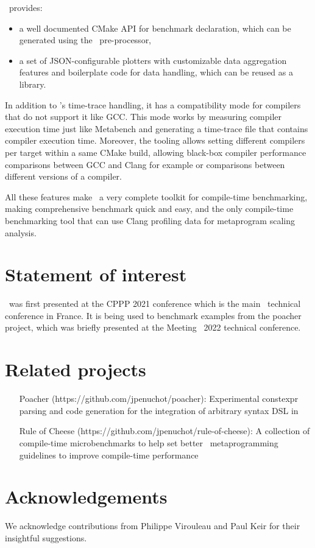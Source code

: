 \documentclass[../../main.tex]{subfiles}
\begin{document}
\ctbench~provides:

\begin{itemize}
\item a well documented CMake API for benchmark declaration, which can be
      generated using the \cpp~pre-processor,
\item a set of JSON-configurable plotters with customizable data aggregation
      features and boilerplate code for data handling, which can be reused as a
      \cpp library.
\end{itemize}

In addition to \ctbench's time-trace handling, it has a compatibility mode
for compilers that do not support it like GCC. This mode works by measuring
compiler execution time just like Metabench\cite{metabench} and generating a
time-trace file that contains compiler execution time. Moreover, the tooling
allows setting different compilers per target within a same CMake build,
allowing black-box compiler performance comparisons between GCC and Clang for
example or comparisons between different versions of a compiler.

All these features make \ctbench~a very complete toolkit for compile-time
benchmarking, making comprehensive benchmark quick and easy, and the only
compile-time benchmarking tool that can use Clang profiling data for metaprogram
scaling analysis.

\section{Statement of interest}

\ctbench~was first presented at the CPPP 2021 conference\cite{ctbench-cppp21}
which is the main \cpp~technical conference in France. It is being used to
benchmark examples from the poacher\cite{poacher} project, which was briefly
presented at the Meeting \cpp~2022\cite{meetingcpp22} technical conference.

\section{Related projects}

\begin{itemize}
\item [Poacher](https://github.com/jpenuchot/poacher): Experimental constexpr
      parsing and code generation for the integration of arbitrary syntax DSL in

\item [Rule of Cheese](https://github.com/jpenuchot/rule-of-cheese):
      A collection of compile-time microbenchmarks to help set better
      \cpp~metaprogramming guidelines to improve compile-time performance
\end{itemize}

\section{Acknowledgements}

We acknowledge contributions from Philippe Virouleau and Paul Keir for their
insightful suggestions.
\end{document}
